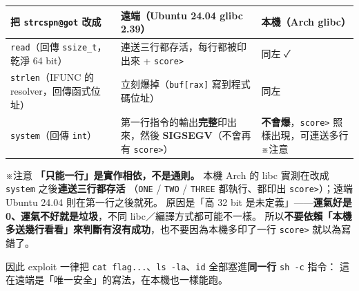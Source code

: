 \documentclass[10pt,a4paper]{article}
\newcounter{none}
\renewenvironment{quote}{%
  \begin{mdframed}[linewidth=0pt,innerleftmargin=0pt,innerrightmargin=0pt,
    innerbottommargin=0pt,innertopmargin=0pt,skipabove=0.55em,skipbelow=0.55em,
    leftmargin=0.9em,rightmargin=0.4em,startcode={\color{quotebar}\vrule width 2.6pt},%
    endcode={}]%
  \itshape\color{black}%
}{%
  \end{mdframed}%
}
\begin{document}
{\def\LTcaptype{none} %
\begin{longtable}[]{@{}
  >{\raggedright\arraybackslash}p{}
  >{\raggedright\arraybackslash}p{}
  >{\raggedright\arraybackslash}p{}@{}}
\toprule\noalign{}
\begin{minipage}[b]{\linewidth}\raggedright
把 \texttt{strcspn@got} 改成
\end{minipage} & \begin{minipage}[b]{\linewidth}\raggedright
遠端（Ubuntu 24.04 glibc 2.39）
\end{minipage} & \begin{minipage}[b]{\linewidth}\raggedright
本機（Arch glibc）
\end{minipage} \\
\midrule\noalign{}
\endhead
\bottomrule\noalign{}
\endlastfoot
\texttt{read}（回傳 \texttt{ssize\_\allowbreak{}t}，乾淨 64 bit） &
連送三行都存活，每行都被印出來 + \texttt{score\textgreater{}\allowbreak{}} & 同左
✓ \\
\texttt{strlen}（IFUNC 的 resolver，回傳函式位址） &
立刻爆掉（\texttt{buf{[}rax{]}} 寫到程式碼位址） & 同左 \\
\texttt{system}（回傳 \texttt{int}） &
第一行指令的輸出\textbf{完整}印出來，然後 \textbf{SIGSEGV}（不會再有
\texttt{score\textgreater{}\allowbreak{}}） &
\textbf{不會爆}，\texttt{score\textgreater{}\allowbreak{}} 照樣出現，可連送多行
※注意 \\
\end{longtable}
}

\begin{quote}
※注意 \textbf{「只能一行」是實作相依，不是通則。} 本機 Arch 的 libc
實測在改成 \texttt{system} 之後\textbf{連送三行都存活} （\texttt{ONE} /
\texttt{TWO} / \texttt{THREE} 都執行、都印出
\texttt{score\textgreater{}\allowbreak{}}）；遠端 Ubuntu 24.04 則在第一行之後就死。
原因是「高 32 bit 是未定義」------\textbf{運氣好是
0、運氣不好就是垃圾}，不同 libc／編譯方式都可能不一樣。
所以\textbf{不要依賴「本機多送幾行看看」來判斷有沒有成功}，也不要因為本機多印了一行
\texttt{score\textgreater{}\allowbreak{}} 就以為寫錯了。
\end{quote}

因此 exploit 一律把 \texttt{cat\ \allowbreak{}flag...}、\texttt{ls\ \allowbreak{}-\allowbreak{}la}、\texttt{id}
全部塞進\textbf{同一行} \texttt{sh\ \allowbreak{}-\allowbreak{}c} 指令：
這在遠端是「唯一安全」的寫法，在本機也一樣能跑。
\end{document}
